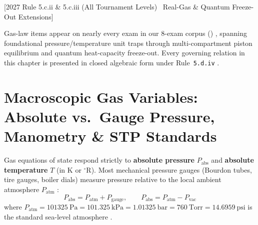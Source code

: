 [2027 Rule 5.c.ii \& 5.c.iii (All Tournament Levels) \textbar\ Real-Gas \& Quantum Freeze-Out Extensions]


Gas-law items appear on nearly every exam in our 8-exam corpus () , spanning foundational pressure/temperature unit traps through multi-compartment piston equilibrium and quantum heat-capacity freeze-out. Every governing relation in this chapter is presented in closed algebraic form under Rule~\texttt{5.d.iv} .

\section{Macroscopic Gas Variables: Absolute vs.\ Gauge Pressure, Manometry \& STP Standards}\label{sec:06.1}

Gas equations of state respond strictly to \textbf{absolute pressure} $P_{\mathrm{abs}}$ and \textbf{absolute temperature} $T$ (in $\si{\kelvin}$ or $^\circ\mathrm{R}$). Most mechanical pressure gauges (Bourdon tubes, tire gauges, boiler dials) measure pressure relative to the local ambient atmosphere $P_{\mathrm{atm}}$ :
\begin{equation}\label{eq:06:pressure-abs}
  P_{\mathrm{abs}} = P_{\mathrm{atm}} + P_{\mathrm{gauge}}, \qquad P_{\mathrm{abs}} = P_{\mathrm{atm}} - P_{\mathrm{vac}}
\end{equation}
where $P_{\mathrm{atm}} = \SI{101325}{\pascal} = \SI{101.325}{\kilo\pascal} = \SI{1.01325}{\bar} = \SI{760}{\text{Torr}} = \SI{14.6959}{\text{psi}}$ is the standard sea-level atmosphere .

